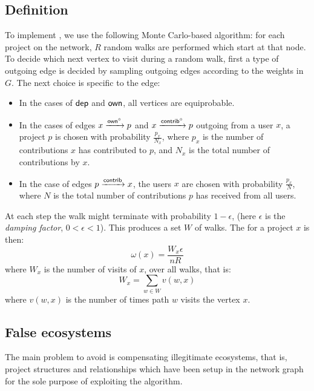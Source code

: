 \subsection{Definition}

To implement \osrank{}, we use the following Monte Carlo-based algorithm: for each
project on the network, $R$ random walks are performed which start at that
node. To decide which next vertex to visit during a random walk, first a type of
outgoing edge is decided by sampling outgoing edges according to the weights in
$G$. The next choice is specific to the edge:

\begin{itemize}
\item In the cases of $\mathsf{dep}$ and $\mathsf{own}$, all vertices are equiprobable.
\item In the cases of edges $x \xrightarrow[]{\mathsf{own}^\circ} p$ and
  $x \xrightarrow[]{\mathsf{contrib}^\circ} p$ outgoing from a user $x$, a project $p$ is
  chosen with probability $\frac{p_x}{N_x}$, where $p_x$ is the number of
  contributions $x$ has contributed to $p$, and $N_x$ is the total number of
  contributions by $x$.
\item In the case of edges $p \xrightarrow[]{\mathsf{contrib}} x$, the users $x$ are
  chosen with probability $\frac{p_x}{N}$, where $N$ is the total number of
  contributions $p$ has received from all users.
\end{itemize}

At each step the walk might terminate with probability $1 - \epsilon$, (here
$\epsilon$ is the \emph{damping factor}, $0 < \epsilon < 1$). This produces a
set $W$ of walks. The \osrank{} for a project $x$ is then:
\[
  \omega(x) = \frac{W_x \epsilon}{n R}
\]
where $W_x$ is the number of visits of $x$, over all walks, that is:
\[
W_x = \sum_{w \in W} v(w,x)
\]
where $v(w,x)$ is the number of times path $w$ visits the vertex $x$.

\subsection{False ecosystems}

The main problem to avoid is compensating illegitimate ecosystems, that is,
project structures and relationships which have been setup in the
network graph for the sole purpose of exploiting the \osrank{} algorithm.


